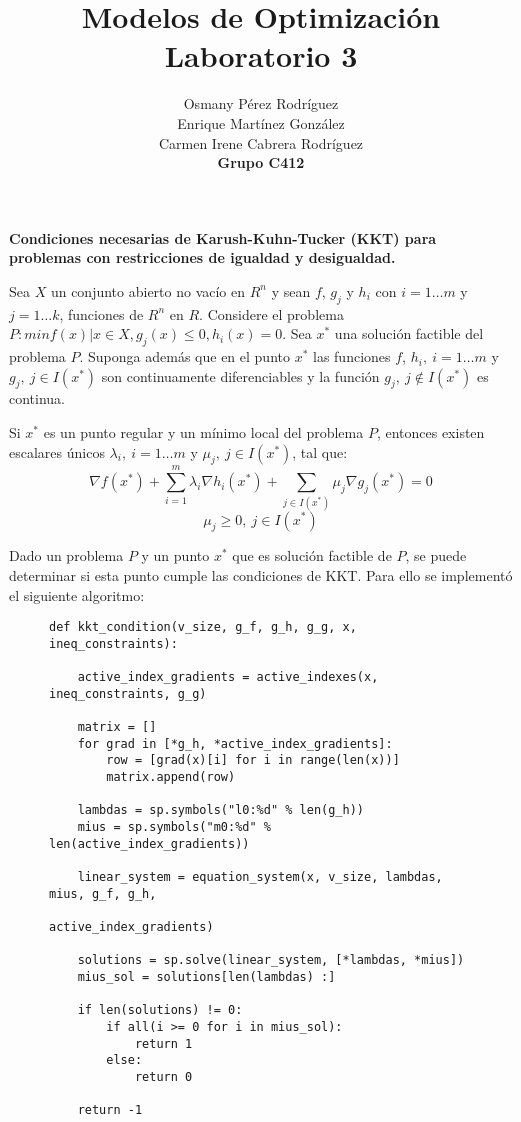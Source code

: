 \documentclass[titlepage, 11pt]{scrartcl}
\title{
    \normalfont\normalsize
    {\huge Modelos de Optimización\\
    		\textbf{Laboratorio 3}}
    \vspace{12pt}
}
\author{Osmany P\'erez Rodr\'iguez\\
		Enrique Mart\'inez Gonz\'alez\\
		Carmen Irene Cabrera Rodr\'iguez\\
		\textbf{Grupo C412}}
\date{}
\begin{document}
    \maketitle 
    
	\textbf{Condiciones necesarias de Karush-Kuhn-Tucker (KKT) para problemas con restricciones de igualdad y desigualdad.}
	
	Sea $X$ un conjunto abierto no vacío en $R^n$ y sean $f$, $g_j$ y $h_i$ con $i = 1 \ldots m$ y $j = 1\ldots k$, funciones de $R^n$ en $R$. Considere el problema $P: min{f(x) | x \in X, g_j(x) \leq 0, h_i(x) = 0}$. Sea $x^*$ una solución factible del problema $P$. Suponga además que en el punto $x^*$ las funciones $f$, $h_i , \ i = 1 \ldots m$ y $g_j, \ j \in I(x^*)$ son continuamente diferenciables y la función $g_j, \ j\notin I(x^*)$ es continua.
	
	Si $x^*$ es un punto regular y un mínimo local del problema $P$, entonces existen escalares únicos $\lambda_i, \ i = 1 \ldots m$ y $\mu_j, \ j \in I(x^*)$, tal que:
	\begin{equation*}
		\nabla f(x^*) + \sum_{i = 1}^{m}\lambda_i \nabla h_i(x^*) + \sum_{j \in I(x^*)}\mu_j \nabla g_j(x^*) = 0
	\end{equation*}
	\begin{equation*}
		\mu_j \geq 0, \ j \in I(x^*)
	\end{equation*}
	
	Dado un problema $P$ y un punto $x^*$ que es solución factible de $P$, se puede determinar si esta punto cumple las condiciones de KKT. Para ello se implement\'o el siguiente algoritmo:
	
	\begin{figure}[H]
		\begin{verbatim}
def kkt_condition(v_size, g_f, g_h, g_g, x, ineq_constraints):

	active_index_gradients = active_indexes(x, ineq_constraints, g_g)
	
	matrix = []
	for grad in [*g_h, *active_index_gradients]:
		row = [grad(x)[i] for i in range(len(x))]
		matrix.append(row)
		
	lambdas = sp.symbols("l0:%d" % len(g_h))
	mius = sp.symbols("m0:%d" % len(active_index_gradients))
		
	linear_system = equation_system(x, v_size, lambdas, mius, g_f, g_h,
									 active_index_gradients)
	
	solutions = sp.solve(linear_system, [*lambdas, *mius])
	mius_sol = solutions[len(lambdas) :]
	
	if len(solutions) != 0:
		if all(i >= 0 for i in mius_sol):
			return 1
		else:
			return 0
	
	return -1  
		\end{verbatim}
	\end{figure}
\end{document}
